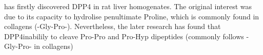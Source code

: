 \citet{Hopsu-Havu1966} has firstly discovered DPP4 in rat liver homogenates. The original interest was due to its capacity to hydrolise penultimate Proline, which is commonly found in collagens (-Gly-Pro-). Nevertheless, the later research has found that DPP4inabilily to cleave Pro-Pro and Pro-Hyp dipeptides (commonly follows -Gly-Pro- in collagens) 